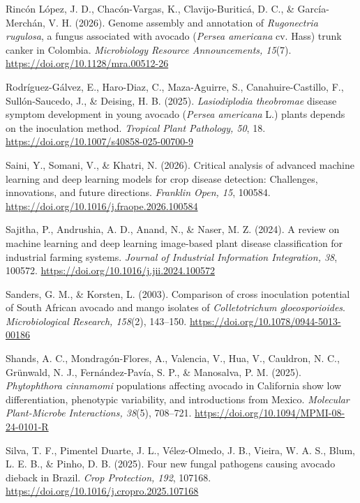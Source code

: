 \documentclass[11pt]{article}
\newcommand{\referencia}[1]{{\RaggedRight\hangindent=1.27cm\hangafter=1 #1\par}\vspace{-2pt}}
\begin{document}
\referencia{Rincón López, J. D., Chacón-Vargas, K., Clavijo-Buriticá, D. C., \& García-Merchán, V. H. (2026). Genome assembly and annotation of \textit{Rugonectria rugulosa}, a fungus associated with avocado (\textit{Persea americana} cv. Hass) trunk canker in Colombia. \textit{Microbiology Resource Announcements, 15}(7). \url{https://doi.org/10.1128/mra.00512-26}}

\referencia{Rodríguez-Gálvez, E., Haro-Diaz, C., Maza-Aguirre, S., Canahuire-Castillo, F., Sullón-Saucedo, J., \& Deising, H. B. (2025). \textit{Lasiodiplodia theobromae} disease symptom development in young avocado (\textit{Persea americana} L.) plants depends on the inoculation method. \textit{Tropical Plant Pathology, 50}, 18. \url{https://doi.org/10.1007/s40858-025-00700-9}}

\referencia{Saini, Y., Somani, V., \& Khatri, N. (2026). Critical analysis of advanced machine learning and deep learning models for crop disease detection: Challenges, innovations, and future directions. \textit{Franklin Open, 15}, 100584. \url{https://doi.org/10.1016/j.fraope.2026.100584}}

\referencia{Sajitha, P., Andrushia, A. D., Anand, N., \& Naser, M. Z. (2024). A review on machine learning and deep learning image-based plant disease classification for industrial farming systems. \textit{Journal of Industrial Information Integration, 38}, 100572. \url{https://doi.org/10.1016/j.jii.2024.100572}}

\referencia{Sanders, G. M., \& Korsten, L. (2003). Comparison of cross inoculation potential of South African avocado and mango isolates of \textit{Colletotrichum gloeosporioides}. \textit{Microbiological Research, 158}(2), 143–150. \url{https://doi.org/10.1078/0944-5013-00186}}

\referencia{Shands, A. C., Mondragón-Flores, A., Valencia, V., Hua, V., Cauldron, N. C., Grünwald, N. J., Fernández-Pavía, S. P., \& Manosalva, P. M. (2025). \textit{Phytophthora cinnamomi} populations affecting avocado in California show low differentiation, phenotypic variability, and introductions from Mexico. \textit{Molecular Plant-Microbe Interactions, 38}(5), 708–721. \url{https://doi.org/10.1094/MPMI-08-24-0101-R}}

\referencia{Silva, T. F., Pimentel Duarte, J. L., Vélez-Olmedo, J. B., Vieira, W. A. S., Blum, L. E. B., \& Pinho, D. B. (2025). Four new fungal pathogens causing avocado dieback in Brazil. \textit{Crop Protection, 192}, 107168. \url{https://doi.org/10.1016/j.cropro.2025.107168}}
\end{document}
